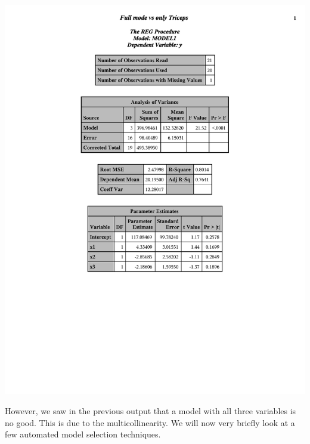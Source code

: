 \documentclass{article}
\begin{document}
\begin{center}
\includegraphics[page=4,scale=0.6,trim= 10mm 200mm 10mm 10mm]{bodyfatexampletriceps}
\end{center}

However, we saw in the previous output that a model with all three variables is no good.  This is due to the multicollinearity.  We will now very briefly look at a few automated model selection techniques.\\~\\
\end{document}
